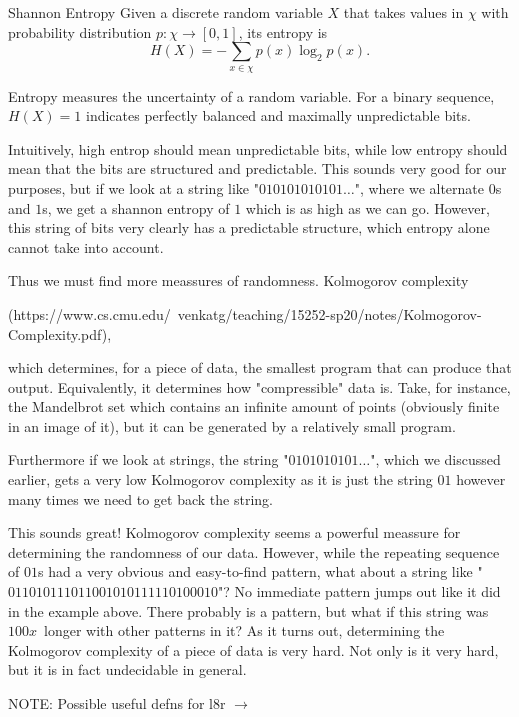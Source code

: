 \begin{defn}{Shannon Entropy}{}
Given a discrete random variable $X$ that takes values in $\chi$ with 
probability distribution $p:\chi \to [0,1]$, its entropy is
$$
    H(X) = - \sum_{x \in \chi} p(x) \log_2 p(x).
$$
\end{defn}

Entropy measures the uncertainty of a random variable. 
For a binary sequence, $H(X) = 1$ indicates perfectly balanced and 
maximally unpredictable bits.

Intuitively, high entrop should mean unpredictable bits, while 
low entropy should mean that the bits are structured and predictable.
This sounds very good for our purposes, but if we look at 
a string like "$010101010101\dots$", where we alternate 
$0$s and $1$s, we get a shannon entropy of $1$ which is as high 
as we can go. However, this string of bits very clearly has 
a predictable structure, which entropy alone cannot take into account.

Thus we must find more meassures of randomness. Kolmogorov complexity 

(https://www.cs.cmu.edu/~venkatg/teaching/15252-sp20/notes/Kolmogorov-Complexity.pdf), 

which determines, 
for a piece of data, the smallest program that can produce that 
output. Equivalently, it determines how "compressible" data is.
Take, for instance, the Mandelbrot set which contains an infinite 
amount of points (obviously finite in an image of it), but 
it can be generated by a relatively small program. 

Furthermore if we look at strings, the string 
"$0101010101\dots$", which we discussed earlier, gets a very low 
Kolmogorov complexity as it is just the string $01$ however 
many times we need to get back the string. 

This sounds great! Kolmogorov complexity seems a powerful meassure 
for determining the randomness of our data. However, while the 
repeating sequence of $01$s had a very obvious and easy-to-find 
pattern, what about a string like 
"$011010111011001010111110100010$"? No immediate pattern jumps out 
like it did in the example above. There probably is a pattern, but 
what if this string was $100x$ longer with other patterns 
in it? As it turns out, determining the Kolmogorov complexity 
of a piece of data is very hard. Not only is it very hard, but it 
is in fact undecidable in general.

NOTE: Possible useful defns for l8r $\rightarrow$


